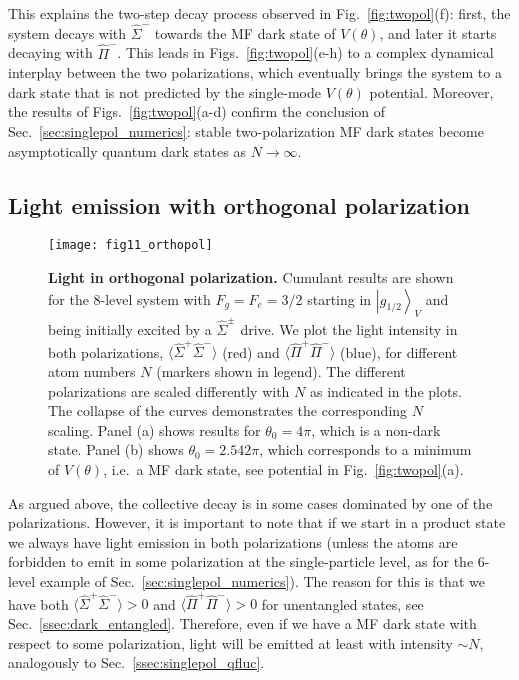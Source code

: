 \documentclass[aps,prx,superscriptaddress,twocolumn,notitlepage,nofootinbib,longbibliography]{revtex4-2}
\newcommand{\ket}[1]{\left|#1\right>}
\begin{document}
This explains the two-step decay process observed in Fig.~\ref{fig:twopol}(f): first, the system decays with $\hat{\Sigma}^-$ towards the MF dark state of $V(\theta)$, and later it starts decaying with $\hat{\Pi}^-$.
This leads in Figs.~\ref{fig:twopol}(e-h) to a complex dynamical interplay between the two polarizations, which eventually brings the system to a dark state that is not predicted by the single-mode $V(\theta)$ potential. Moreover, the results of Figs.~\ref{fig:twopol}(a-d) confirm the conclusion of Sec.~\ref{sec:singlepol_numerics}: stable two-polarization MF dark states become asymptotically quantum dark states as $N\rightarrow\infty$.








\subsection{Light emission with orthogonal polarization\label{ssec:ortho_light}}

\begin{figure}[t]
\centering
\texttt{[image: fig11\_orthopol]}
\caption{\textbf{Light in orthogonal polarization.} Cumulant results are shown for the 8-level system with $F_g=F_e=3/2$ starting in $\ket{g_{1/2}}_V$ and being initially excited by a $\hat{\Sigma}^\pm$ drive. We plot the light intensity in both polarizations, $\langle \hat{\Sigma}^+\hat{\Sigma}^- \rangle$ (red) and $\langle \hat{\Pi}^+\hat{\Pi}^- \rangle$ (blue), for different atom numbers $N$ (markers shown in legend). The different polarizations are scaled differently with $N$ as indicated in the plots. The collapse of the curves demonstrates the corresponding $N$ scaling. Panel (a) shows results for $\theta_0=4\pi$, which is a non-dark state. Panel (b) shows $\theta_0=2.542\pi$, which corresponds to a minimum of $V(\theta)$, i.e.~a MF dark state, see potential in Fig.~\ref{fig:twopol}(a).}
\label{fig:orthopol}
\end{figure}

As argued above, the collective decay is in some cases dominated by one of the polarizations. However, it is important to note that if we start in a product state we always have light emission in both polarizations (unless the atoms are forbidden to emit in some polarization at the single-particle level, as for the 6-level example of Sec.~\ref{sec:singlepol_numerics}). The reason for this is that we have both $\langle \hat{\Sigma}^+\hat{\Sigma}^- \rangle>0$ and $\langle \hat{\Pi}^+\hat{\Pi}^- \rangle>0$ for unentangled states, see Sec.~\ref{ssec:dark_entangled}. Therefore, even if we have a MF dark state with respect to some polarization, light will be emitted at least with intensity $\sim N$, analogously to Sec.~\ref{ssec:singlepol_qfluc}.
\end{document}

